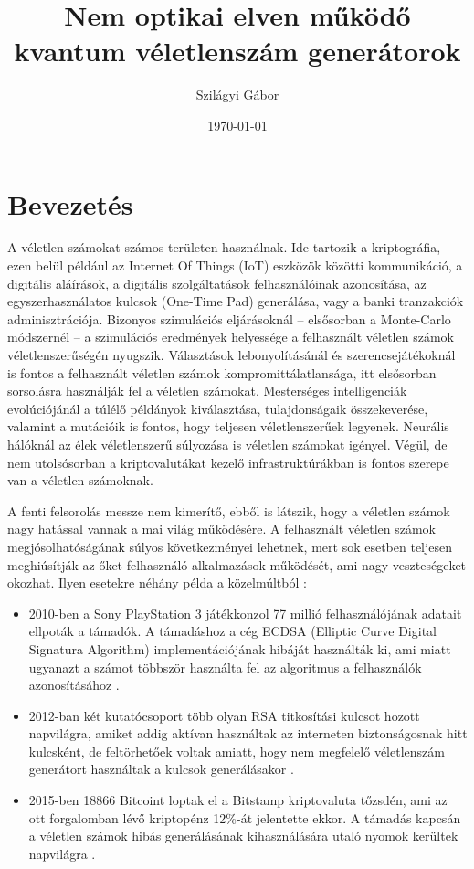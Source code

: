 \documentclass[12pt,a4paper,oneside]{article}
\title{Nem optikai elven működő \\ kvantum véletlenszám generátorok}
\author{Szilágyi Gábor}
\date{\today}
\begin{document}
\maketitle
\section*{Bevezetés}
A véletlen számokat számos területen használnak. Ide tartozik a kriptográfia, ezen belül például az Internet Of Things (IoT) eszközök közötti kommunikáció, a digitális aláírások, a digitális szolgáltatások felhasználóinak azonosítása, az egyszerhasználatos kulcsok (One-Time Pad) generálása, vagy a banki tranzakciók adminisztrációja. Bizonyos szimulációs eljárásoknál -- elsősorban a Monte-Carlo módszernél -- a szimulációs eredmények helyessége a felhasznált véletlen számok véletlenszerűségén nyugszik. Választások lebonyolításánál és szerencsejátékoknál is fontos a felhasznált véletlen számok kompromittálatlansága, itt elsősorban sorsolásra használják fel a véletlen számokat. Mesterséges intelligenciák evolúciójánál a túlélő példányok kiválasztása, tulajdonságaik összekeverése, valamint a mutációik is fontos, hogy teljesen véletlenszerűek legyenek. Neurális hálóknál az élek véletlenszerű súlyozása is véletlen számokat igényel. Végül, de nem utolsósorban a kriptovalutákat kezelő infrastruktúrákban is fontos szerepe van a véletlen számoknak.
\par
A fenti felsorolás messze nem kimerítő, ebből is látszik, hogy a véletlen számok nagy hatással vannak a mai világ működésére. A felhasznált véletlen számok megjósolhatóságának súlyos következményei lehetnek, mert sok esetben teljesen meghiúsítják az őket felhasználó alkalmazások működését, ami nagy veszteségeket okozhat. Ilyen esetekre néhány példa a közelmúltból \cite{altalanos-random}:
\begin{itemize}
	\item 2010-ben a Sony PlayStation 3 játékkonzol 77 millió felhasználójának adatait ellpoták a támadók. A támadáshoz a cég ECDSA (Elliptic Curve Digital Signatura Algorithm) implementációjának hibáját használták ki, ami miatt ugyanazt a számot többször használta fel az algoritmus a felhasználók azonosításához \cite{sony}.
	\item 2012-ban két kutatócsoport több olyan RSA titkosítási kulcsot hozott napvilágra, amiket addig aktívan használtak az interneten biztonságosnak hitt kulcsként, de feltörhetőek voltak amiatt, hogy nem megfelelő véletlenszám generátort használtak a kulcsok generálásakor \cite{bad-rsa}.
	\item 2015-ben 18866 Bitcoint loptak el a Bitstamp kriptovaluta tőzsdén, ami az ott forgalomban lévő kriptopénz 12\%-át jelentette ekkor. A támadás kapcsán a véletlen számok hibás generálásának kihasználására utaló nyomok kerültek napvilágra \cite{bitstamp}.
\end{itemize}
\end{document}
